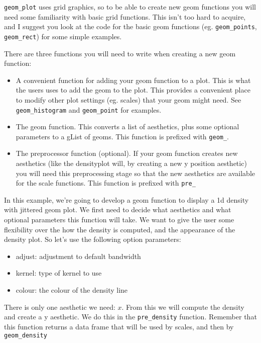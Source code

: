 {\tt geom\_plot} uses grid graphics, so to be able to create new geom functions you will need some familiarity with basic grid functions.  This isn't too hard to acquire, and I suggest you look at the code for the basic geom functions (eg. {\tt geom\_points}, {\tt geom\_rect}) for some simple examples.

There are three functions you will need to write when creating a new geom function:

\begin{itemize}
	\item A convenient function for adding your geom function to a plot.  This is what the users uses to add the geom to the plot.  This provides a convenient place to modify other plot settings (eg. scales) that your geom might need.  See {\tt geom\_histogram} and {\tt geom\_point} for examples.

	\item The geom function.  This converts a list of aesthetics, plus some optional parameters to a gList of geoms.  This function is prefixed with {\tt geom\_}.  
	
	\item The preprocessor function (optional).  If your geom function creates new aesthetics (like the densityplot will, by creating a new y position aesthetic) you will need this preprocessing stage so that the new aesthetics are available for the scale functions.  This function is prefixed with {\tt pre\_}
\end{itemize}

In this example, we're going to develop a geom function to display a 1d density with jittered geom plot.  We first need to decide what aesthetics and what optional parameters this function will take.  We want to give the user some flexibility over the how the density is computed, and the appearance of the density plot.  So let's use the following option parameters:

\begin{itemize}
	\item adjust: adjustment to default bandwidth
	\item kernel: type of kernel to use
	\item colour: the colour of the density line
\end{itemize}

There is only one aesthetic we need: $x$.  From this we will compute the density and create a y aesthetic.  We do this in the {\tt pre\_density} function.  Remember that this function returns a data frame that will be used by scales, and then by {\tt geom\_density}

